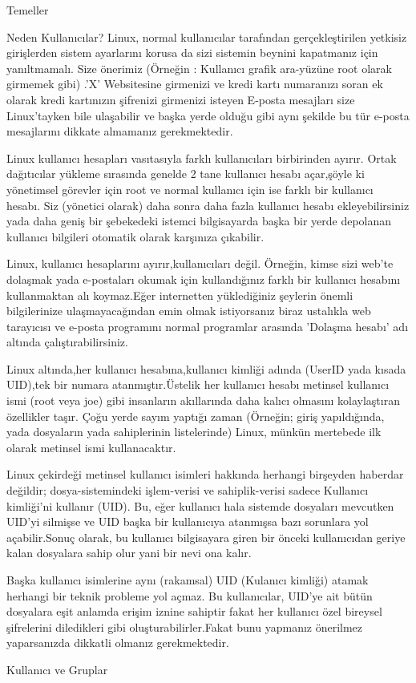 \begin{section}{Temeller}
\begin{subsection}{Neden Kullanıcılar?}
Linux, normal kullanıcılar tarafından gerçekleştirilen yetkisiz girişlerden sistem ayarlarını korusa da sizi sistemin beynini kapatmanız için yanıltmamalı. Size önerimiz (Örneğin : Kullanıcı grafik ara-yüzüne root olarak girmemek gibi) .’X’ Websitesine girmenizi ve kredi kartı numaranızı soran ek olarak kredi kartınızın şifrenizi girmenizi isteyen E-posta mesajları size Linux'tayken bile ulaşabilir ve başka yerde olduğu gibi aynı şekilde bu tür e-posta mesajlarını dikkate almamanız gerekmektedir.

Linux kullanıcı hesapları vasıtasıyla farklı kullanıcıları birbirinden ayırır. Ortak dağıtıcılar yükleme sırasında genelde 2 tane kullanıcı hesabı açar,şöyle ki yönetimsel görevler için root ve normal kullanıcı için ise farklı bir kullanıcı hesabı. Siz (yönetici olarak) daha sonra daha fazla kullanıcı hesabı ekleyebilirsiniz yada daha geniş bir şebekedeki istemci bilgisayarda başka bir yerde depolanan kullanıcı bilgileri otomatik olarak karşınıza çıkabilir.

Linux, kullanıcı hesaplarını ayırır,kullanıcıları değil. Örneğin, kimse sizi web'te dolaşmak yada e-postaları okumak için kullandığınız farklı bir kullanıcı hesabını kullanmaktan alı koymaz.Eğer internetten yüklediğiniz şeylerin önemli bilgilerinize ulaşmayacağından emin olmak istiyorsanız biraz ustalıkla web tarayıcısı ve e-posta programını normal programlar arasında 'Dolaşma hesabı' adı altında çalıştırabilirsiniz.

Linux altında,her kullanıcı hesabına,kullanıcı kimliği adında (UserID yada kısada UID),tek  bir numara atanmıştır.Üstelik her kullanıcı hesabı metinsel kullanıcı ismi (root veya joe) gibi insanların akıllarında daha kalıcı olmasını kolaylaştıran özellikler taşır. Çoğu yerde sayım yaptığı zaman (Örneğin; giriş yapıldığında, yada dosyaların yada sahiplerinin listelerinde) Linux, münkün mertebede ilk olarak metinsel ismi kullanacaktır.

Linux çekirdeği metinsel kullanıcı isimleri hakkında herhangi birşeyden haberdar değildir; dosya-sistemindeki işlem-verisi ve sahiplik-verisi sadece Kullanıcı kimliği'ni kullanır (UID). Bu, eğer kullanıcı hala sistemde dosyaları mevcutken UID’yi silmişse ve UID başka bir kullanıcıya atanmışsa bazı sorunlara yol açabilir.Sonuç olarak, bu kullanıcı bilgisayara giren bir önceki kullanıcıdan geriye kalan dosyalara sahip olur yani bir nevi ona kalır.

Başka kullanıcı isimlerine aynı (rakamsal) UID (Kulanıcı kimliği) atamak herhangi bir teknik probleme yol açmaz. Bu kullanıcılar, UID'ye ait bütün dosyalara eşit anlamda erişim iznine sahiptir fakat her kullanıcı özel bireysel şifrelerini diledikleri gibi oluşturabilirler.Fakat bunu yapmanız önerilmez yaparsanızda dikkatli olmanız gerekmektedir.
\end{subsection}
\begin{subsection}{Kullanıcı ve Gruplar}


\end{subsection}
\end{section}
